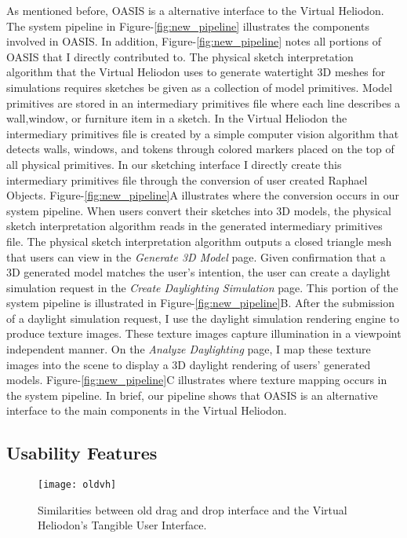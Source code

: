 		As mentioned before, OASIS is a alternative interface to the Virtual Heliodon. 
		The system pipeline in Figure-\ref{fig:new_pipeline} illustrates the components involved in OASIS.
		In addition, Figure-\ref{fig:new_pipeline} notes all portions of OASIS that I directly contributed to.
		The physical sketch interpretation algorithm that the Virtual Heliodon uses to generate watertight 3D meshes for simulations requires sketches be given as a collection of model primitives. 
		Model primitives are stored in an intermediary primitives file where each line describes a wall,window, or furniture item in a sketch.
		In the Virtual Heliodon the intermediary primitives file is created by a simple computer vision algorithm that detects walls, windows, and tokens through colored markers placed on the top of all physical primitives.
		In our sketching interface I directly create this intermediary primitives file through the conversion of user created Raphael Objects.
		Figure-\ref{fig:new_pipeline}A illustrates where the conversion occurs in our system pipeline.
		When users convert their sketches into 3D models, the physical sketch interpretation algorithm reads in the generated intermediary primitives file.
		The physical sketch interpretation algorithm outputs a closed triangle mesh that users can view in the \textit{Generate 3D Model} page.
		Given confirmation that a 3D generated model matches the user's intention, the user can create a daylight simulation request in the \textit{Create Daylighting Simulation} page.
		This portion of the system pipeline is illustrated in Figure-\ref{fig:new_pipeline}B.
		After the submission of a daylight simulation request, I use the daylight simulation rendering engine to produce texture images.
		These texture images capture illumination in a viewpoint independent manner.
		On the \textit{Analyze Daylighting} page, I map these texture images into the scene to display a 3D daylight rendering of users' generated models.
		Figure-\ref{fig:new_pipeline}C illustrates where texture mapping occurs in the system pipeline.
		In brief, our pipeline shows that OASIS is an alternative interface to the main components in the Virtual Heliodon.

	\subsection{Usability Features}

		\begin{figure}[h]
		\centering
		\texttt{[image: oldvh]}
		\caption{
		Similarities between old drag and drop interface and the Virtual Heliodon's Tangible User Interface. 
		}
		\label{fig:oldvh}
		\end{figure}

